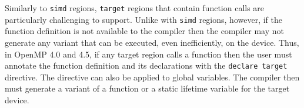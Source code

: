 Similarly to \texttt{simd} regions, \texttt{target} regions that contain 
function calls are particularly challenging to support.  Unlike with 
\texttt{simd} regions, however, if the function definition is not 
available to the compiler then the compiler may not generate any variant
that can be executed, even inefficiently, on the device. Thus, in OpenMP 4.0
and 4.5, if any target region calls a function then the user must annotate  
the function definition and its declarations with the \texttt{declare target} 
directive. The directive can also be applied to global variables. The compiler
then must generate a variant of a function or a static lifetime variable for 
the target device. 

